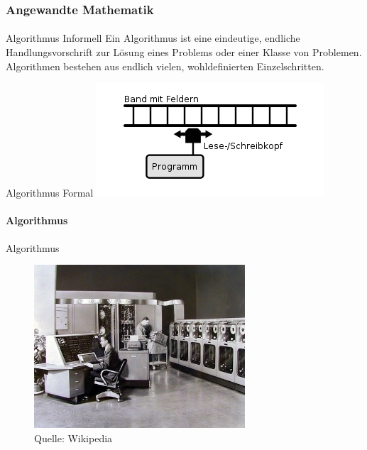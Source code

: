 \documentclass{beamer}
\begin{document}
\begin{frame}
    \frametitle{Angewandte Mathematik}
\framesubtitle{}
    \begin{block}{Algorithmus Informell}
Ein Algorithmus ist eine eindeutige, endliche Handlungsvorschrift zur Lösung eines Problems oder einer Klasse von Problemen. Algorithmen bestehen aus endlich vielen, wohldefinierten Einzelschritten.
\end{block}
    \begin{block}{Algorithmus Formal}
\includegraphics[scale=0.8]{images/Turingmaschine}
\end{block}
 \end{frame}

\begin{frame}
\framesubtitle{Algorithmus}
    \begin{block}{Algorithmus}
\begin{figure}[H]
      \centering
    \includegraphics[width=0.7\textwidth]{images/computer}
      \caption{Quelle: Wikipedia}
\end{figure}
\end{block}

 \end{frame}
\end{document}

